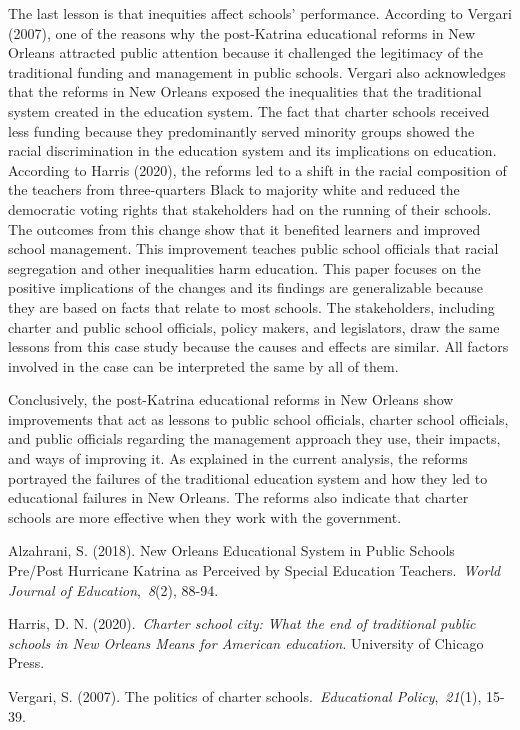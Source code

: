 \documentclass[11pt]{article}
\begin{document}
The last lesson is that inequities affect schools’ performance. According to Vergari (2007), one of the reasons why the post-Katrina educational reforms in New Orleans attracted public attention because it challenged the legitimacy of the traditional funding and management in public schools. Vergari also acknowledges that the reforms in New Orleans exposed the inequalities that the traditional system created in the education system. The fact that charter schools received less funding because they predominantly served minority groups showed the racial discrimination in the education system and its implications on education. According to Harris (2020), the reforms led to a shift in the racial composition of the teachers from three-quarters Black to majority white and reduced the democratic voting rights that stakeholders had on the running of their schools. The outcomes from this change show that it benefited learners and improved school management. This improvement teaches public school officials that racial segregation and other inequalities harm education. This paper focuses on the positive implications of the changes and its findings are generalizable because they are based on facts that relate to most schools. The stakeholders, including charter and public school officials, policy makers, and legislators, draw the same lessons from this case study because the causes and effects are similar. All factors involved in the case can be interpreted the same by all of them.

Conclusively, the post-Katrina educational reforms in New Orleans show improvements that act as lessons to public school officials, charter school officials, and public officials regarding the management approach they use, their impacts, and ways of improving it. As explained in the current analysis, the reforms portrayed the failures of the traditional education system and how they led to educational failures in New Orleans. The reforms also indicate that charter schools are more effective when they work with the government.

\begin{references}
\item Alzahrani, S. (2018). New Orleans Educational System in Public Schools Pre/Post Hurricane Katrina as Perceived by Special Education Teachers. \textit{World Journal of Education}, \textit{8}(2), 88-94.
\item Harris, D. N. (2020). \textit{Charter school city: What the end of traditional public schools in New Orleans Means for American education}. University of Chicago Press.
\item Vergari, S. (2007). The politics of charter schools. \textit{Educational Policy}, \textit{21}(1), 15-39.
\end{references}
\end{document}
